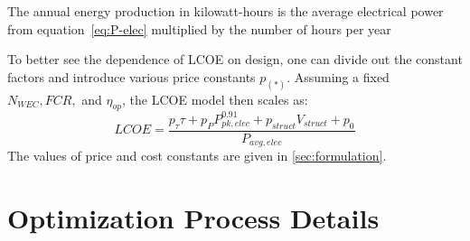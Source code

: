 The annual energy production in kilowatt-hours is the average electrical power from equation~\eqref{eq:P-elec} multiplied by the number of hours per year

To better see the dependence of LCOE on design, one can divide out the constant factors and introduce various price constants $p_{(*)}$.
Assuming a fixed $N_{WEC}, FCR,$ and $\eta_{op}$, the LCOE model then scales as:
\begin{equation}\label{eq:LCOE-scale}
  LCOE = \frac{p_\tau \tau + p_{P}P_{pk,elec}^{0.91} + p_{struct} V_{struct} + p_0}{P_{avg,elec}}
\end{equation}
The values of price and cost constants are given in \ref{sec:formulation}.



\clearpage
\section{Optimization Process Details}


